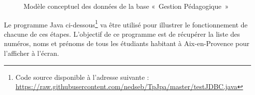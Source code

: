 \documentclass{article}
\begin{document}
\begin{figure}
\caption{Modèle conceptuel des données de la base «~Gestion Pédagogique~»\label{mcd_gestion_peda}}
\end{figure}

Le programme Java ci-dessous\footnote{Code source disponible à l'adresse suivante : \url{https://raw.githubusercontent.com/nedseb/TpJpa/master/testJDBC.java}} va être utilisé pour illustrer le fonctionnement de chacune de ces étapes. L'objectif de ce programme est de récupérer la liste des numéros, noms et prénoms de tous les étudiants habitant à Aix-en-Provence pour l'afficher à l'écran.
\pagebreak
\end{document}
